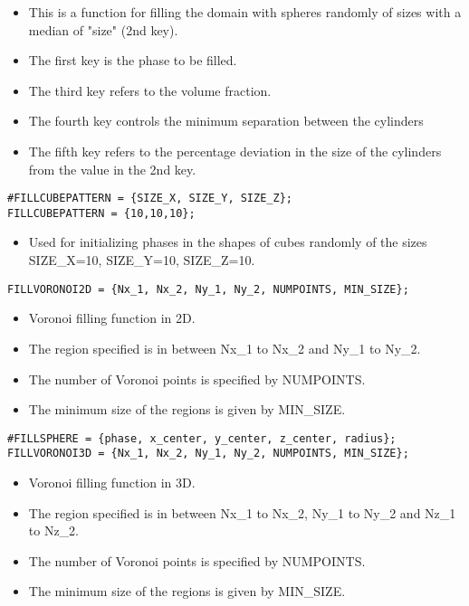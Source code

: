 \documentclass[a4paper,10pt]{article}
\begin{document}
\begin{itemize}
 \item This is a function for filling the domain with spheres randomly of sizes with a median of "size" (2nd key).
 \item The first key is the phase to be filled.
 \item The third key refers to the volume fraction.
 \item The fourth key controls the minimum separation between the cylinders
 \item The fifth key refers to the percentage deviation in the size of the cylinders from the value in the 2nd key.
\end{itemize}


\begin{lstlisting}
#FILLCUBEPATTERN = {SIZE_X, SIZE_Y, SIZE_Z};
FILLCUBEPATTERN = {10,10,10};
\end{lstlisting}

\begin{itemize}
 \item Used for initializing phases in the shapes of cubes randomly of the sizes SIZE\_X=10, SIZE\_Y=10, SIZE\_Z=10. 
\end{itemize}

\begin{lstlisting}
FILLVORONOI2D = {Nx_1, Nx_2, Ny_1, Ny_2, NUMPOINTS, MIN_SIZE};
\end{lstlisting}

\begin{itemize}
 \item Voronoi filling function in 2D.
 \item The region specified is in between Nx\_1 to Nx\_2 and Ny\_1 to Ny\_2.
 \item The number of Voronoi points is specified by NUMPOINTS.
 \item The minimum size of the regions is given by MIN\_SIZE.
\end{itemize}


\begin{lstlisting}
#FILLSPHERE = {phase, x_center, y_center, z_center, radius};
FILLVORONOI3D = {Nx_1, Nx_2, Ny_1, Ny_2, NUMPOINTS, MIN_SIZE};
\end{lstlisting}

\begin{itemize}
 \item Voronoi filling function in 3D.
 \item The region specified is in between Nx\_1 to Nx\_2, Ny\_1 to Ny\_2 and Nz\_1 to Nz\_2.
 \item The number of Voronoi points is specified by NUMPOINTS.
 \item The minimum size of the regions is given by MIN\_SIZE.
\end{itemize}
\end{document}
